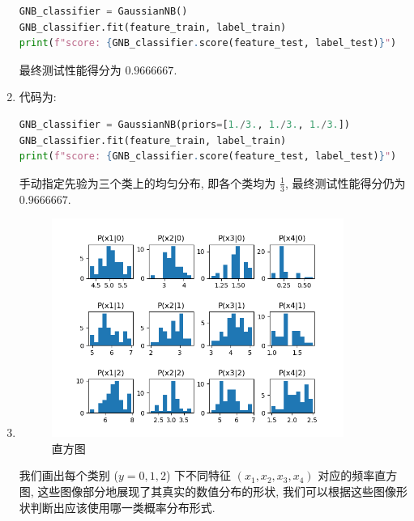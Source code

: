 \documentclass[answers]{exam}  %
\begin{document}
\begin{questions}
\begin{solution}
\begin{enumerate}
            \begin{lstlisting}[language=Python]
GNB_classifier = GaussianNB()
GNB_classifier.fit(feature_train, label_train)
print(f"score: {GNB_classifier.score(feature_test, label_test)}")
\end{lstlisting}

            最终测试性能得分为 $0.9666667$.

      \item

            代码为:

            \begin{lstlisting}[language=Python]
GNB_classifier = GaussianNB(priors=[1./3., 1./3., 1./3.])
GNB_classifier.fit(feature_train, label_train)
print(f"score: {GNB_classifier.score(feature_test, label_test)}")
\end{lstlisting}

            手动指定先验为三个类上的均匀分布, 即各个类均为 $\frac{1}{3}$, 最终测试性能得分仍为 $0.9666667$.

      \item

            \begin{figure}[H]
              \centering
              \includegraphics[width=0.90\textwidth]{images/Figure_1.png}
              \caption{直方图}\label{ch5_img:mlp}
            \end{figure}

            我们画出每个类别 ($y=0,1,2$) 下不同特征 $(x_1, x_2, x_3, x_4)$ 对应的频率直方图, 这些图像部分地展现了其真实的数值分布的形状, 我们可以根据这些图像形状判断出应该使用哪一类概率分布形式.


\end{enumerate}
\end{solution}
\end{questions}
\end{document}
